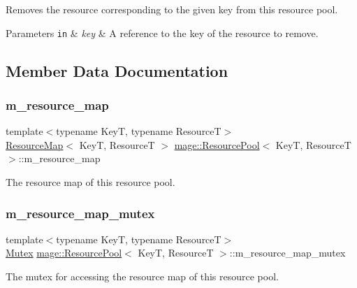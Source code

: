 Removes the resource corresponding to the given key from this resource pool.


\begin{DoxyParams}[1]{Parameters}
\mbox{\tt in}  & {\em key} & A reference to the key of the resource to remove. \\
\hline
\end{DoxyParams}


\subsection{Member Data Documentation}
\hypertarget{classmage_1_1_resource_pool_aecc46ecca2a54ef2816137276b1d73cd}{}\label{classmage_1_1_resource_pool_aecc46ecca2a54ef2816137276b1d73cd} 
\subsubsection{\texorpdfstring{m\+\_\+resource\+\_\+map}{m\_resource\_map}}
{\footnotesize\ttfamily template$<$typename KeyT, typename ResourceT$>$ \\
\hyperlink{namespacemage_a3aaea9153b9e896914d7a1155d8c7bbe}{Resource\+Map}$<$ KeyT, ResourceT $>$ \hyperlink{classmage_1_1_resource_pool}{mage\+::\+Resource\+Pool}$<$ KeyT, ResourceT $>$\+::m\+\_\+resource\+\_\+map\hspace{0.3cm}{\ttfamily [private]}}

The resource map of this resource pool. \hypertarget{classmage_1_1_resource_pool_a5857b70ac755db750dcaff5277201f9f}{}\label{classmage_1_1_resource_pool_a5857b70ac755db750dcaff5277201f9f} 
\subsubsection{\texorpdfstring{m\+\_\+resource\+\_\+map\+\_\+mutex}{m\_resource\_map\_mutex}}
{\footnotesize\ttfamily template$<$typename KeyT, typename ResourceT$>$ \\
\hyperlink{structmage_1_1_mutex}{Mutex} \hyperlink{classmage_1_1_resource_pool}{mage\+::\+Resource\+Pool}$<$ KeyT, ResourceT $>$\+::m\+\_\+resource\+\_\+map\+\_\+mutex\hspace{0.3cm}{\ttfamily [private]}}

The mutex for accessing the resource map of this resource pool. 